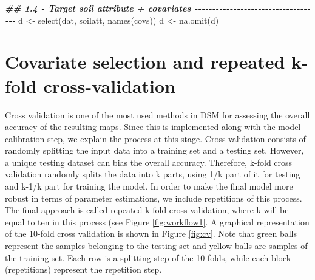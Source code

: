 \documentclass[
  10pt,
  b5paper,
  oneside]{book}
\newenvironment{Shaded}{\begin{snugshade}}{\end{snugshade}}
\newcommand{\DocumentationTok}[1]{\textcolor[rgb]{0.56,0.35,0.01}{\textbf{\textit{#1}}}}
\newcommand{\FunctionTok}[1]{\textcolor[rgb]{0.00,0.00,0.00}{#1}}
\newcommand{\NormalTok}[1]{#1}
\newcommand{\OtherTok}[1]{\textcolor[rgb]{0.56,0.35,0.01}{#1}}
\begin{document}
\begin{Shaded}
\begin{Highlighting}[]
\DocumentationTok{\#\# 1.4 {-} Target soil attribute + covariates {-}{-}{-}{-}{-}{-}{-}{-}{-}{-}{-}{-}{-}{-}{-}{-}{-}{-}{-}{-}{-}{-}{-}{-}{-}{-}{-}{-}{-}{-}{-}{-}{-}{-}{-}{-}}
\NormalTok{d }\OtherTok{\textless{}{-}} \FunctionTok{select}\NormalTok{(dat, soilatt, }\FunctionTok{names}\NormalTok{(covs))}
\NormalTok{d }\OtherTok{\textless{}{-}} \FunctionTok{na.omit}\NormalTok{(d)}
\end{Highlighting}
\end{Shaded}

\hypertarget{covariate-selection-and-repeated-k-fold-cross-validation}{%
\section{Covariate selection and repeated k-fold cross-validation}\label{covariate-selection-and-repeated-k-fold-cross-validation}}

Cross validation is one of the most used methods in DSM for assessing the overall accuracy of the resulting maps. Since this is implemented along with the model calibration step, we explain the process at this stage. Cross validation consists of randomly splitting the input data into a training set and a testing set. However, a unique testing dataset can bias the overall accuracy. Therefore, k-fold cross validation randomly splits the data into k parts, using 1/k part of it for testing and k-1/k part for training the model. In order to make the final model more robust in terms of parameter estimations, we include repetitions of this process. The final approach is called repeated k-fold cross-validation, where k will be equal to ten in this process (see Figure \ref{fig:workflow1}. A graphical representation of the 10-fold cross validation is shown in Figure \ref{fig:cv}. Note that green balls represent the samples belonging to the testing set and yellow balls are samples of the training set. Each row is a splitting step of the 10-folds, while each block (repetitions) represent the repetition step.
\end{document}
